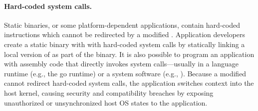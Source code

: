 \paragraph{Hard-coded system calls.}
Static binaries, or some platform-dependent applications, contain hard-coded  instructions
which cannot be redirected by a modified \libc{}.
Application developers
create a static binary with with hard-coded system calls by statically linking a local version of \libc{} as part of the binary.
It is also possible to program an application
with assembly code that directly invokes system calls---usually in a language runtime (e.g., the go runtime) or a system software (e.g., ).
Because a modified \libc{} cannot redirect hard-coded system calls,
the application switches context into the host kernel,
causing security and compatibility breaches by exposing unauthorized or unsynchronized host OS states to the application.



